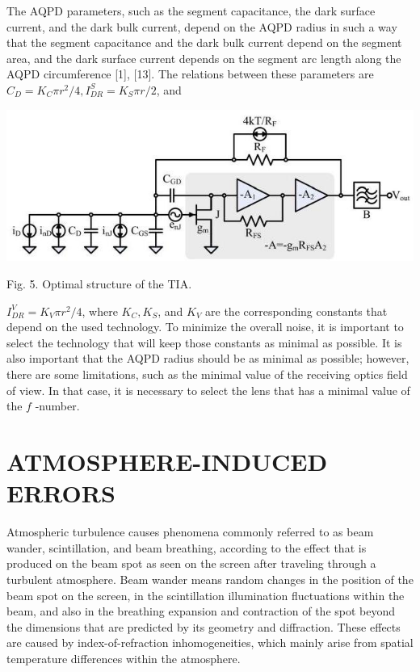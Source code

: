 \documentclass[10pt]{article}
\begin{document}
The AQPD parameters, such as the segment capacitance, the dark surface current, and the dark bulk current, depend on the AQPD radius in such a way that the segment capacitance and the dark bulk current depend on the segment area, and the dark surface current depends on the segment arc length along the AQPD circumference [1], [13]. The relations between these parameters are \(C_{D}=K_{C} \pi r^{2} / 4, I_{D R}^{S}=K_{S} \pi r / 2\), and

\includegraphics[max width=\textwidth]{5ecfdecb1168916efbeaf9054b715324-07}

Fig. 5. Optimal structure of the TIA.

\(I_{D R}^{V}=K_{V} \pi r^{2} / 4\), where \(K_{C}, K_{S}\), and \(K_{V}\) are the corresponding constants that depend on the used technology. To minimize the overall noise, it is important to select the technology that will keep those constants as minimal as possible. It is also important that the AQPD radius should be as minimal as possible; however, there are some limitations, such as the minimal value of the receiving optics field of view. In that case, it is necessary to select the lens that has a minimal value of the \(f\) -number.

\section{ATMOSPHERE-INDUCED ERRORS}
Atmospheric turbulence causes phenomena commonly referred to as beam wander, scintillation, and beam breathing, according to the effect that is produced on the beam spot as seen on the screen after traveling through a turbulent atmosphere. Beam wander means random changes in the position of the beam spot on the screen, in the scintillation illumination fluctuations within the beam, and also in the breathing expansion and contraction of the spot beyond the dimensions that are predicted by its geometry and diffraction. These effects are caused by index-of-refraction inhomogeneities, which mainly arise from spatial temperature differences within the atmosphere.
\end{document}
